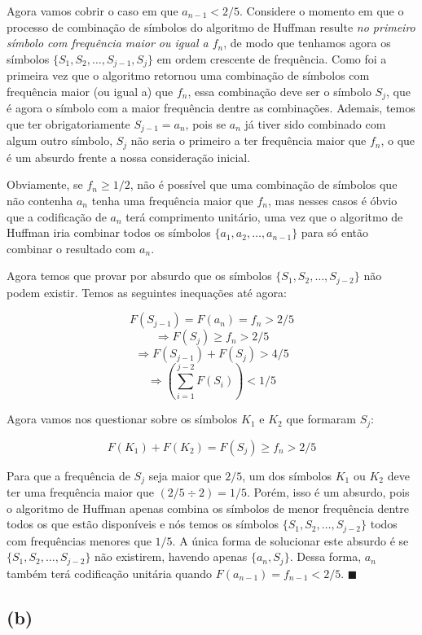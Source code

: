 \documentclass[12pt, a4paper]{article}
\begin{document}
Agora vamos cobrir o caso em que $a_{n-1} < 2/5$. Considere o momento em que o processo de combinação de símbolos do algoritmo de Huffman resulte \emph{no primeiro símbolo com frequência maior ou igual a $f_n$}, de modo que tenhamos agora os símbolos $\{S_1, S_2, \ldots, S_{j-1}, S_j\}$ em ordem crescente de frequência. Como foi a primeira vez que o algoritmo retornou uma combinação de símbolos com frequência maior (ou igual a) que $f_n$, essa combinação deve ser o símbolo $S_j$, que é agora o símbolo com a maior frequência dentre as combinações. Ademais, temos que ter obrigatoriamente $S_{j-1}=a_n$, pois se $a_n$ já tiver sido combinado com algum outro símbolo, $S_j$ não seria o primeiro a ter frequência maior que $f_n$, o que é um absurdo frente a nossa consideração inicial.

Obviamente, se $f_n \geq 1/2$, não é possível que uma combinação de símbolos que não contenha $a_n$ tenha uma frequência maior que $f_n$, mas nesses casos é óbvio que a codificação de $a_n$ terá comprimento unitário, uma vez que o algoritmo de Huffman iria combinar todos os símbolos $\{a_1, a_2, \ldots, a_{n-1} \}$ para só então combinar o resultado com $a_n$.

Agora temos que provar por absurdo que os símbolos $\{ S_1, S_2, \ldots, S_{j-2} \}$ não podem existir. Temos as seguintes inequações até agora:

\[ F(S_{j-1}) = F(a_n) = f_n > 2/5 \]
\[ \Rightarrow F(S_j) \geq f_n > 2/5 \]
\[ \Rightarrow F(S_{j-1}) + F(S_j) > 4/5 \]
\[ \Rightarrow \left( \sum_{i=1}^{j-2} F(S_i) \right) < 1/5 \]

Agora vamos nos questionar sobre os símbolos $K_1$ e $K_2$ que formaram $S_j$:

\[ F(K_1) + F(K_2) = F(S_j) \geq f_n > 2/5 \]

Para que a frequência de $S_j$ seja maior que $2/5$, um dos símbolos $K_1$ ou $K_2$ deve ter uma frequência maior que $(2/5 \div 2)=1/5$. Porém, isso é um absurdo, pois o algoritmo de Huffman apenas combina os símbolos de menor frequência dentre todos os que estão disponíveis e nós temos os símbolos $\{ S_1, S_2, \ldots, S_{j-2} \}$ todos com frequências menores que $1/5$. A única forma de solucionar este absurdo é se $\{ S_1, S_2, \ldots, S_{j-2} \}$ não existirem, havendo apenas $\{a_n, S_j\}$. Dessa forma, $a_n$ também terá codificação unitária quando $F(a_{n-1})=f_{n-1}<2/5$. $\blacksquare$

\subsection*{(b)}
\end{document}
